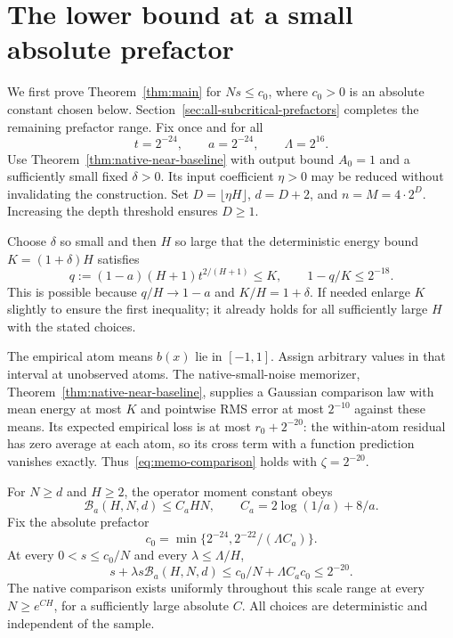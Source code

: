 \section{The lower bound at a small absolute prefactor}
\label{sec:assembly}
We first prove Theorem~\ref{thm:main} for $Ns\le c_0$, where $c_0>0$ is an absolute constant chosen below. Section~\ref{sec:all-subcritical-prefactors} completes the remaining prefactor range. Fix once and for all
\[
 t=2^{-24},\qquad a=2^{-24},\qquad \Lambda=2^{16}.
\]
Use Theorem~\ref{thm:native-near-baseline} with output bound $A_0=1$ and a sufficiently small fixed $\delta>0$. Its input coefficient $\eta>0$ may be reduced without invalidating the construction. Set $D=\lfloor\eta H\rfloor$, $d=D+2$, and $n=M=4\cdot2^D$. Increasing the depth threshold ensures $D\ge1$.

Choose $\delta$ so small and then $H$ so large that the deterministic energy bound $K=(1+\delta)H$ satisfies
\begin{equation}
 q:=(1-a)(H+1)t^{2/(H+1)}\le K,
 \qquad 1-q/K\le2^{-18}.
 \label{eq:ratio-choice}
\end{equation}
This is possible because $q/H\to1-a$ and $K/H=1+\delta$. If needed enlarge $K$ slightly to ensure the first inequality; it already holds for all sufficiently large $H$ with the stated choices.

The empirical atom means $b(x)$ lie in $[-1,1]$. Assign arbitrary values in that interval at unobserved atoms. The native-small-noise memorizer, Theorem~\ref{thm:native-near-baseline}, supplies a Gaussian comparison law with mean energy at most $K$ and pointwise RMS error at most $2^{-10}$ against these means. Its expected empirical loss is at most $r_0+2^{-20}$: the within-atom residual has zero average at each atom, so its cross term with a function prediction vanishes exactly. Thus~\eqref{eq:memo-comparison} holds with $\zeta=2^{-20}$.

For $N\ge d$ and $H\ge2$, the operator moment constant obeys
\[
 \mathcal B_a(H,N,d)\le C_a HN,
 \qquad C_a=2\log(1/a)+8/a.
\]
Fix the absolute prefactor
\[
 c_0=\min\{2^{-24},2^{-22}/(\Lambda C_a)\}.
\]
At every $0<s\le c_0/N$ and every $\lambda\le\Lambda/H$,
\begin{equation}
 s+\lambda s\mathcal B_a(H,N,d)
 \le c_0/N+\Lambda C_a c_0\le2^{-20}.
 \label{eq:small-noise-choice}
\end{equation}
The native comparison exists uniformly throughout this scale range at every $N\ge e^{CH}$, for a sufficiently large absolute $C$. All choices are deterministic and independent of the sample.

